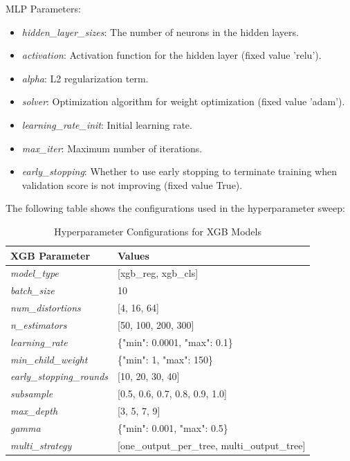\noindent
MLP Parameters:
\begin{itemize}
    \item \textit{hidden\_layer\_sizes}: The number of neurons in the hidden layers.
    \item \textit{activation}: Activation function for the hidden layer (fixed value 'relu').
    \item \textit{alpha}: L2 regularization term.
    \item \textit{solver}: Optimization algorithm for weight optimization (fixed value 'adam').
    \item \textit{learning\_rate\_init}: Initial learning rate.
    \item \textit{max\_iter}: Maximum number of iterations.
    \item \textit{early\_stopping}: Whether to use early stopping to terminate training when validation score is not improving (fixed value True).
\end{itemize}
\vspace{\baselineskip}
\noindent
The following table shows the configurations used in the hyperparameter sweep: \par
\begin{table}[h]
    \centering
    \begin{tabular}{|l|l|}
        \hline
        \textbf{XGB Parameter} & \textbf{Values} \\
        \hline
        \textit{model\_type} & [xgb\_reg, xgb\_cls] \\
        \textit{batch\_size} & 10 \\
        \textit{num\_distortions} & [4, 16, 64] \\
        \textit{n\_estimators} & [50, 100, 200, 300] \\
        \textit{learning\_rate} & \{"min": 0.0001, "max": 0.1\} \\
        \textit{min\_child\_weight} & \{"min": 1, "max": 150\} \\
        \textit{early\_stopping\_rounds} & [10, 20, 30, 40] \\
        \textit{subsample} & [0.5, 0.6, 0.7, 0.8, 0.9, 1.0] \\
        \textit{max\_depth} & [3, 5, 7, 9] \\
        \textit{gamma} & \{"min": 0.001, "max": 0.5\} \\
        \textit{multi\_strategy} & [one\_output\_per\_tree, multi\_output\_tree] \\
        \hline
    \end{tabular}
    \caption{Hyperparameter Configurations for XGB Models}
    \label{table:xgb_hyperparams}
\end{table}

